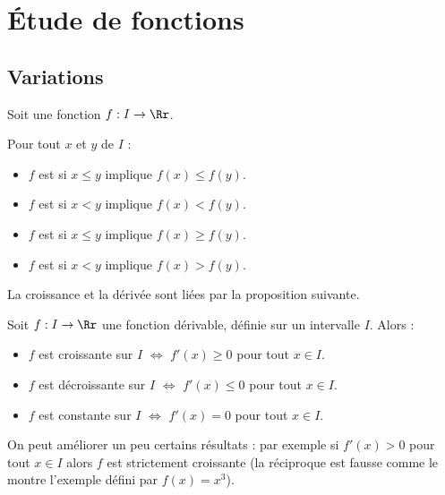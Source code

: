 \documentclass[11pt,class=report,crop=false]{standalone}
\begin{document}

\section{Étude de fonctions}

\subsection{Variations}

Soit une fonction $f : I \to \Rr$.
\begin{definition}
Pour tout $x$ et $y$ de $I$ : 
\begin{itemize}
  \item $f$ est  si $x\le y$ implique $f(x) \le f(y)$. 
  \item $f$ est  si $x < y$ implique $f(x) < f(y)$. 
  \item $f$ est  si $x\le y$ implique $f(x) \ge f(y)$. 
  \item $f$ est  si $x < y$ implique $f(x) > f(y)$.
\end{itemize}    
\end{definition}



La croissance et la dérivée sont liées par la proposition suivante.
\begin{proposition}
Soit $f : I \to \Rr$ une fonction dérivable, définie sur un intervalle $I$.
Alors :
\begin{itemize}
\item $f$ est croissante sur $I$ $\iff$ $f'(x)\ge0$ pour tout $x \in I$.
  \item $f$ est décroissante  sur $I$ $\iff$ $f'(x)\le0$ pour tout $x \in I$.  
  \item $f$ est constante  sur $I$ $\iff$ $f'(x) = 0$ pour tout $x \in I$.
\end{itemize}
\end{proposition}

On peut améliorer un peu certains résultats : par exemple si $f'(x)>0$ pour tout $x\in I$ alors $f$ est strictement croissante (la réciproque est fausse comme le montre l'exemple défini par $f(x)=x^3$).
\end{document}
